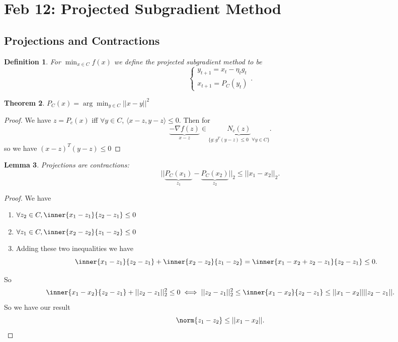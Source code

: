 \documentclass[a4paper]{article}
\newtheorem{thm}{Theorem}[section]
\newtheorem{lem}[thm]{Lemma}
\newtheorem{defn}[thm]{Definition}
\begin{document}
\section{Feb 12: Projected Subgradient Method}

\subsection{Projections and Contractions}
\begin{defn}
    For $\min_{x\in C}f(x)$ we define the projected subgradient method to be 
\[
\begin{cases}
    y_{t+1}=x_t-\eta_t g_t \\
    x_{t+1}=P_{C}(y_{t})
\end{cases}
.\] 
\end{defn}
\begin{thm}
    $P_C(x)=\arg\min_{y\in C}||x-y||^2$
\end{thm}
\begin{proof}
    We have $z=P_c(x)$ iff $\forall y\in C$, $\langle x-z,y-z\rangle \leq 0$.
    Then for \[
        \underbrace{-\nabla f(z)}_{x-z}\in \underbrace{N_c(z)}_{ \{g: g^T(y-z)\leq 0 \text{ } \forall y\in C\}}
    .\] so we have $(x-z)^T(y-z)\leq 0$
\end{proof}
\begin{lem}
    Projections are contractions: \[
    ||\underbrace{P_C(x_1)}_{z_1}-\underbrace{P_C(x_2)}_{z_2}||_2 \leq ||x_1-x_2||_2
    .\]
\end{lem}
\begin{proof}
    We have 
    \begin{enumerate}
        \item $\forall z_2\in C, \inner{x_1-z_1}{z_2-z_1} \leq 0 $
        \item $\forall z_1\in C, \inner{x_2-z_2}{z_1-z_2} \leq 0 $
        \item Adding these two inequalities we have \[
        \inner{x_1-z_1}{z_2-z_1}+\inner{x_2-z_2}{z_1-z_2}=\inner{x_1-x_2+z_2-z_1}{z_2-z_1} \leq 0
        .\]
    \end{enumerate}
    So \[
        \inner{x_1-x_2}{z_2-z_1}+||z_2-z_1||_2^2\leq 0\iff ||z_2-z_1||_2^2\leq \inner{x_1-x_2}{z_2-z_1}\leq ||x_1-x_2||||z_2-z_1||
        .\] 
        So we have our result \[
        \norm{z_1-z_2}\leq ||x_1-x_2||
        .\] 
\end{proof}
\end{document}
